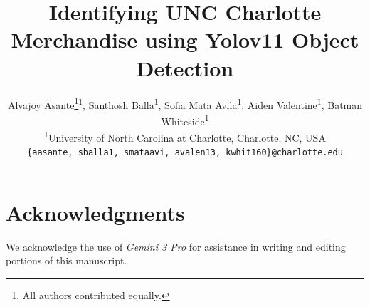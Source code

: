 \documentclass[10pt,twocolumn,letterpaper]{article}
\title{Identifying UNC Charlotte Merchandise using Yolov11 Object Detection}
\author{%
Alvajoy Asante\thanks{All authors contributed equally.}\textsuperscript{1},\;
Santhosh Balla\footnotemark[1]\textsuperscript{1},\;
Sofia Mata Avila\footnotemark[1]\textsuperscript{1},\;
Aiden Valentine\footnotemark[1]\textsuperscript{1},\;
Batman Whiteside\footnotemark[1]\textsuperscript{1}\\[4pt]
{\small
\textsuperscript{1}University of North Carolina at Charlotte, Charlotte, NC, USA}\\
{\tt\small \{aasante, sballa1, smataavi, avalen13, kwhit160\}@charlotte.edu}
}
\begin{document}
\maketitle








\section*{Acknowledgments}
We acknowledge the use of \textit{Gemini 3 Pro} for assistance in writing and editing portions of this manuscript.


{
    \small
    
    
}

% 
\end{document}
